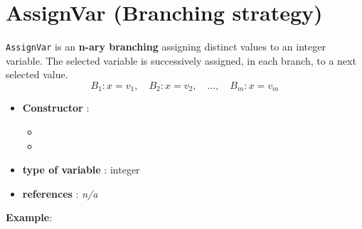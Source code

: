 \section{AssignVar (Branching strategy)}\label{assignvar:assignvarbranchstrat}\hypertarget{assignvar:assignvarbranchstrat}{}
\begin{notedef}
  \texttt{AssignVar} is an \textbf{n-ary branching} assigning distinct values to an integer variable. The selected variable is successively assigned, in each branch, to a next selected value.
$$B_1: x=v_1,\quad B_2: x= v_2,\quad\ldots,\quad B_m: x= v_m$$
\end{notedef}

\begin{itemize}
	\item \textbf{Constructor} :
      \begin{itemize}
      \item {}
      \item {}
      \end{itemize}
	\item \textbf{type of variable} : integer
	\item \textbf{references} : \emph{n/a}
\end{itemize}

\textbf{Example}:
%

